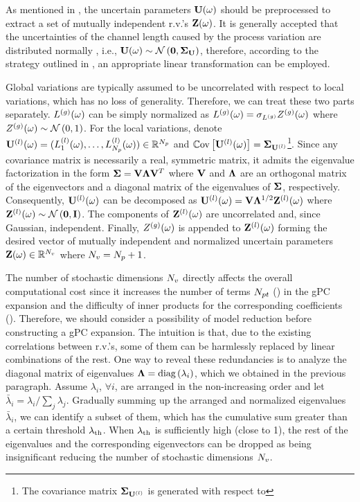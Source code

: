 As mentioned in , the uncertain parameters $\mathbf{U}(\omega)$ should be preprocessed to extract a set of mutually independent r.v.'s $\mathbf{Z}(\omega)$. It is generally accepted that the uncertainties of the channel length caused by the process variation are distributed normally \cite{srivastava2010, liu2007, juan2012}, i.e., $\vU(\o) \sim \normal{\vZero}{\mCov_\vU}$, therefore, according to the strategy outlined in , an appropriate linear transformation can be employed.

Global variations are typically assumed to be uncorrelated with respect to local variations, which has no loss of generality. Therefore, we can treat these two parts separately. ${L^{(g)}}(\omega)$ can be simply normalized as ${L^{(g)}}(\omega) = \sigma_{L^{(g)}} {Z^{(g)}}(\omega)$ where ${Z^{(g)}}(\omega) \sim \mathcal{N}\left( 0, 1 \right)$. For the local variations, denote ${\mathbf{U}^{(l)}}(\omega) = (L^{(l)}_1(\omega), \dotsc, L^{(l)}_{N_p}(\omega)) \in \mathbb{R}^{N_p}$ and $\oCov{\vlLeff(\o)} = \mCov_\vlLeff$\footnote{The covariance matrix $\mCov_\vlLeff$ is generated with respect to }. Since any covariance matrix is necessarily a real, symmetric matrix, it admits the eigenvalue factorization \cite{press2007} in the form $\mCov = \m{V} \m{\Lambda} \m{V}^T$ where $\m{V}$ and $\m{\Lambda}$ are an orthogonal matrix of the eigenvectors and a diagonal matrix of the eigenvalues of $\mCov$, respectively. Consequently, ${\mathbf{U}^{(l)}}(\omega)$ can be decomposed as $\vlLeff(\o) = \m{V} \m{\Lambda}^\ifrac{1}{2} \vlZ(\o)$ where $\vlZ(\o) \sim \normal{\vZero}{\mI}$. The components of ${\mathbf{Z}^{(l)}}(\omega)$ are uncorrelated and, since Gaussian, independent. Finally, ${Z^{(g)}}(\omega)$ is appended to ${\mathbf{Z}^{(l)}}(\omega)$ forming the desired vector of mutually independent and normalized uncertain parameters $\mathbf{Z}(\omega) \in \mathbb{R}^{N_v}$ where ${N_v} = {N_p} + 1$.

The number of stochastic dimensions ${N_v}$ directly affects the overall computational cost since it increases the number of terms ${N_{pt}}$ () in the gPC expansion and the difficulty of inner products for the corresponding coefficients (). Therefore, we should consider a possibility of model reduction before constructing a gPC expansion. The intuition is that, due to the existing correlations between r.v.'s, some of them can be harmlessly replaced by linear combinations of the rest. One way to reveal these redundancies is to analyze the diagonal matrix of eigenvalues $\m{\Lambda} = \diag{ \lambda_i }$, which we obtained in the previous paragraph. Assume $\lambda_i$, $\forall i$, are arranged in the non-increasing order and let $\bar{\lambda}_i = \lambda_i / \sum_j \lambda_j$. Gradually summing up the arranged and normalized eigenvalues $\bar{\lambda}_i$, we can identify a subset of them, which has the cumulative sum greater than a certain threshold $\lambda_\text{th}$. When $\lambda_\text{th}$ is sufficiently high (close to 1), the rest of the eigenvalues and the corresponding eigenvectors can be dropped as being insignificant reducing the number of stochastic dimensions ${N_v}$.

